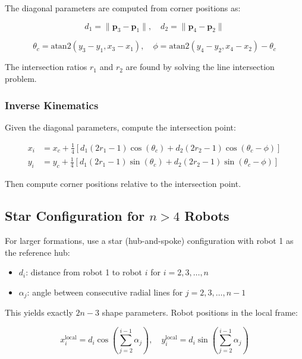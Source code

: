 \documentclass{article}
\begin{document}
The diagonal parameters are computed from corner positions as:

\begin{equation}
d_1 = \|\mathbf{p}_3 - \mathbf{p}_1\|, \quad d_2 = \|\mathbf{p}_4 - \mathbf{p}_2\|
\end{equation}

\begin{equation}
\theta_c = \text{atan2}(y_3 - y_1, x_3 - x_1), \quad
\phi = \text{atan2}(y_4 - y_2, x_4 - x_2) - \theta_c
\end{equation}

The intersection ratios $r_1$ and $r_2$ are found by solving the line intersection problem.

\subsubsection{Inverse Kinematics}

Given the diagonal parameters, compute the intersection point:

\begin{equation}
\begin{aligned}
x_i &= x_c + \frac{1}{4}\left[d_1(2r_1 - 1)\cos(\theta_c) + d_2(2r_2 - 1)\cos(\theta_c - \phi)\right] \\
y_i &= y_c + \frac{1}{4}\left[d_1(2r_1 - 1)\sin(\theta_c) + d_2(2r_2 - 1)\sin(\theta_c - \phi)\right]
\end{aligned}
\end{equation}

Then compute corner positions relative to the intersection point.

\subsection{Star Configuration for $n > 4$ Robots}

For larger formations, use a star (hub-and-spoke) configuration with robot 1 as the reference hub:
\begin{itemize}
\item $d_i$: distance from robot 1 to robot $i$ for $i = 2, 3, \ldots, n$ 
\item $\alpha_j$: angle between consecutive radial lines for $j = 2, 3, \ldots, n-1$
\end{itemize}

This yields exactly $2n - 3$ shape parameters. Robot positions in the local frame:

\begin{equation}
x_i^{\text{local}} = d_i \cos\left(\sum_{j=2}^{i-1} \alpha_j\right), \quad
y_i^{\text{local}} = d_i \sin\left(\sum_{j=2}^{i-1} \alpha_j\right)
\end{equation}
\end{document}
